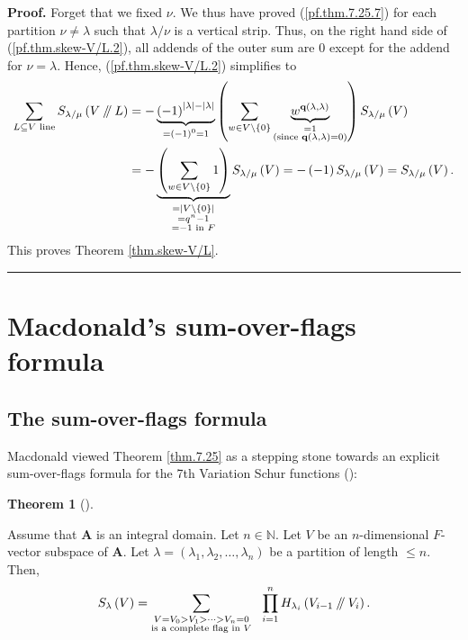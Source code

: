 \documentclass[numbers=enddot,12pt,final,onecolumn,notitlepage]{scrartcl}%
\numberwithin{exer}{section}
\theoremstyle{definition}
\newtheorem{theo}{Theorem}[section]
\newenvironment{theorem}[1][]
{\begin{theo}[#1]\begin{leftbar}}
{\end{leftbar}\end{theo}}
\newenvironment{proof}[1][Proof]{\noindent\textbf{#1.} }{\ \rule{0.5em}{0.5em}}
\let\sumnonlimits\sum
\let\prodnonlimits\prod
\renewcommand{\sum}{\sumnonlimits\limits}
\renewcommand{\prod}{\prodnonlimits\limits}
\newcommand{\sslash}{\mathbin{/\mkern-5mu/}}
\theoremstyle{plainsl}
\begin{document}
\begin{proof}
Forget that we fixed $\nu$. We thus have proved (\ref{pf.thm.7.25.7}) for each
partition $\nu\neq\lambda$ such that $\lambda/\nu$ is a vertical strip. Thus,
on the right hand side of (\ref{pf.thm.skew-V/L.2}), all addends of the outer
sum are $0$ except for the addend for $\nu=\lambda$. Hence,
(\ref{pf.thm.skew-V/L.2}) simplifies to
\begin{align*}
\sum_{L\subseteq V\text{ line}}S_{\lambda/\mu}\left(  V\sslash L\right)   &
=-\underbrace{\left(  -1\right)  ^{\left\vert \lambda\right\vert -\left\vert
\lambda\right\vert }}_{=\left(  -1\right)  ^{0}=1}\left(  \sum_{w\in
V\setminus\left\{  0\right\}  }\underbrace{w^{\mathbf{q}\left(  \lambda
,\lambda\right)  }}_{\substack{=1\\\text{(since }\mathbf{q}\left(
\lambda,\lambda\right)  =0\text{)}}}\right)  S_{\lambda/\mu}\left(  V\right)
\\
&  =-\underbrace{\left(  \sum_{w\in V\setminus\left\{  0\right\}  }1\right)
}_{\substack{=\left\vert V\setminus\left\{  0\right\}  \right\vert
\\=q^{n}-1\\=-1\text{ in }F}}S_{\lambda/\mu}\left(  V\right)  =-\left(
-1\right)  S_{\lambda/\mu}\left(  V\right)  =S_{\lambda/\mu}\left(  V\right)
.
\end{align*}
This proves Theorem \ref{thm.skew-V/L}.
\end{proof}


\section{Macdonald's sum-over-flags formula}

\subsection{The sum-over-flags formula}

Macdonald viewed Theorem \ref{thm.7.25} as a stepping stone towards an
explicit sum-over-flags formula for the 7th Variation Schur functions
(\cite[(7.24 ?)]{Macdon92}):

\begin{theorem}
\label{thm.7.24}Assume that $\mathbf{A}$ is an integral domain. Let
$n\in\mathbb{N}$. Let $V$ be an $n$-dimensional $F$-vector subspace of
$\mathbf{A}$. Let $\lambda=\left(  \lambda_{1},\lambda_{2},\ldots,\lambda
_{n}\right)  $ be a partition of length $\leq n$. Then,%
\[
S_{\lambda}\left(  V\right)  =\sum_{\substack{V=V_{0}>V_{1}>\cdots
>V_{n}=0\\\text{is a complete flag in }V}}\ \ \prod_{i=1}^{n}H_{\lambda_{i}%
}\left(  V_{i-1}\sslash V_{i}\right)  .
\]

\end{theorem}
\end{document}
